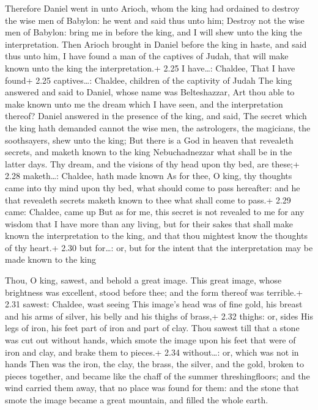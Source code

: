  Therefore Daniel went in unto Arioch, whom the king had
ordained to destroy the wise men of Babylon: he went and said thus unto
him; Destroy not the wise men of Babylon: bring me in before the king,
and I will shew unto the king the interpretation.  Then
Arioch brought in Daniel before the king in haste, and said thus unto
him, I have found a man of the captives of Judah, that will make known
unto the king the interpretation.+ 2.25 I have\ldots: Chaldee, That I
have found+ 2.25 captives\ldots: Chaldee, children of the captivity of
Judah  The king answered and said to Daniel, whose name was
Belteshazzar, Art thou able to make known unto me the dream which I have
seen, and the interpretation thereof?  Daniel answered in
the presence of the king, and said, The secret which the king hath
demanded cannot the wise men, the astrologers, the magicians, the
soothsayers, shew unto the king;  But there is a God in
heaven that revealeth secrets, and maketh known to the king
Nebuchadnezzar what shall be in the latter days. Thy dream, and the
visions of thy head upon thy bed, are these;+ 2.28 maketh\ldots:
Chaldee, hath made known  As for thee, O king, thy thoughts
came into thy mind upon thy bed, what should come to pass hereafter: and
he that revealeth secrets maketh known to thee what shall come to pass.+
2.29 came: Chaldee, came up  But as for me, this secret is
not revealed to me for any wisdom that I have more than any living, but
for their sakes that shall make known the interpretation to the king,
and that thou mightest know the thoughts of thy heart.+ 2.30 but
for\ldots: or, but for the intent that the interpretation may be made
known to the king

 Thou, O king, sawest, and behold a great image. This
great image, whose brightness was excellent, stood before thee; and the
form thereof was terrible.+ 2.31 sawest: Chaldee, wast seeing
 This image's head was of fine gold, his breast and his
arms of silver, his belly and his thighs of brass,+ 2.32 thighs: or,
sides  His legs of iron, his feet part of iron and part of
clay.  Thou sawest till that a stone was cut out without
hands, which smote the image upon his feet that were of iron and clay,
and brake them to pieces.+ 2.34 without\ldots: or, which was not in
hands  Then was the iron, the clay, the brass, the silver,
and the gold, broken to pieces together, and became like the chaff of
the summer threshingfloors; and the wind carried them away, that no
place was found for them: and the stone that smote the image became a
great mountain, and filled the whole earth.

